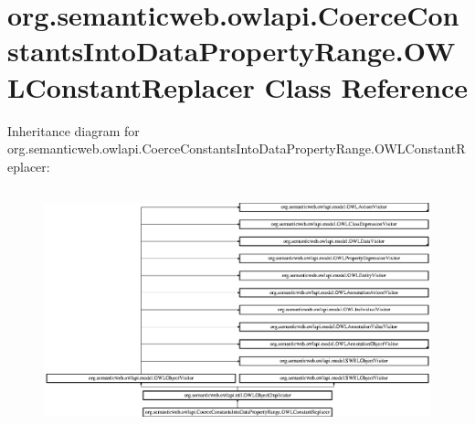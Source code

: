 \hypertarget{classorg_1_1semanticweb_1_1owlapi_1_1_coerce_constants_into_data_property_range_1_1_o_w_l_constant_replacer}{\section{org.\-semanticweb.\-owlapi.\-Coerce\-Constants\-Into\-Data\-Property\-Range.\-O\-W\-L\-Constant\-Replacer Class Reference}
\label{classorg_1_1semanticweb_1_1owlapi_1_1_coerce_constants_into_data_property_range_1_1_o_w_l_constant_replacer}
}
Inheritance diagram for org.\-semanticweb.\-owlapi.\-Coerce\-Constants\-Into\-Data\-Property\-Range.\-O\-W\-L\-Constant\-Replacer\-:\begin{figure}[H]
\begin{center}
\leavevmode
\includegraphics[height=7.013487cm]{classorg_1_1semanticweb_1_1owlapi_1_1_coerce_constants_into_data_property_range_1_1_o_w_l_constant_replacer}
\end{center}
\end{figure}

